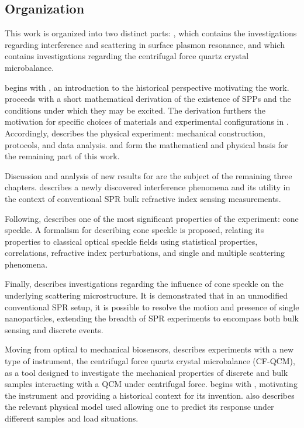 \subsection*{Organization}

This work is organized into two distinct parts: , which
contains the investigations regarding interference and scattering in surface
plasmon resonance, and  which contains investigations regarding
the centrifugal force quartz crystal microbalance.

 begins with , an introduction to the
historical perspective motivating the work.   proceeds
with a short mathematical derivation of the existence of SPPs and the
conditions under which they may be excited.  The derivation furthers the
motivation for specific choices of materials and experimental configurations
in .  Accordingly, 
describes the physical experiment: mechanical construction, protocols, and
data analysis.   and  form the
mathematical and physical basis for the remaining part of this work.

Discussion and analysis of new results for  are the subject of
the remaining three chapters.   describes a newly
discovered interference phenomena and its utility in the context of
conventional SPR bulk refractive index sensing measurements.

Following,  describes one of the most significant
properties of the experiment: cone speckle.  A formalism for describing cone
speckle is proposed, relating its properties to classical optical speckle
fields using statistical properties, correlations, refractive index
perturbations, and single and multiple scattering phenomena.

Finally,  describes investigations regarding the
influence of cone speckle on the underlying scattering microstructure.  It is
demonstrated that in an unmodified conventional SPR setup, it is possible to
resolve the motion and presence of single nanoparticles, extending the breadth
of SPR experiments to encompass both bulk sensing and discrete events.

Moving from optical to mechanical biosensors,  describes
experiments with a new type of instrument, the centrifugal force quartz
crystal microbalance (CF-QCM), as a tool designed to investigate the
mechanical properties of discrete and bulk samples interacting with a QCM
under centrifugal force.   begins with
, motivating the instrument and providing
a historical context for its invention.   also
describes the relevant physical model used allowing one to predict its
response under different samples and load situations.

